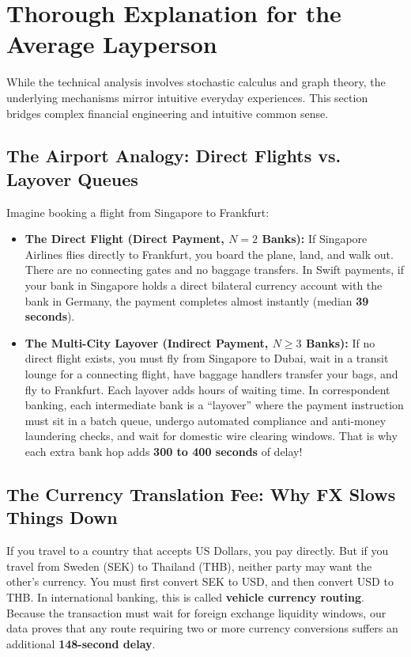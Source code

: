 \documentclass[11pt,a4paper]{article}
\begin{document}
\section{Thorough Explanation for the Average Layperson}

While the technical analysis involves stochastic calculus and graph theory, the underlying mechanisms mirror intuitive everyday experiences. This section bridges complex financial engineering and intuitive common sense.

\subsection{The Airport Analogy: Direct Flights vs. Layover Queues}
Imagine booking a flight from Singapore to Frankfurt:
\begin{itemize}
    \item \textbf{The Direct Flight (Direct Payment, $N=2$ Banks):} If Singapore Airlines flies directly to Frankfurt, you board the plane, land, and walk out. There are no connecting gates and no baggage transfers. In Swift payments, if your bank in Singapore holds a direct bilateral currency account with the bank in Germany, the payment completes almost instantly (median \textbf{39 seconds}).
    \item \textbf{The Multi-City Layover (Indirect Payment, $N \ge 3$ Banks):} If no direct flight exists, you must fly from Singapore to Dubai, wait in a transit lounge for a connecting flight, have baggage handlers transfer your bags, and fly to Frankfurt. Each layover adds hours of waiting time. In correspondent banking, each intermediate bank is a ``layover'' where the payment instruction must sit in a batch queue, undergo automated compliance and anti-money laundering checks, and wait for domestic wire clearing windows. That is why each extra bank hop adds \textbf{300 to 400 seconds} of delay!
\end{itemize}

\subsection{The Currency Translation Fee: Why FX Slows Things Down}
If you travel to a country that accepts US Dollars, you pay directly. But if you travel from Sweden (SEK) to Thailand (THB), neither party may want the other's currency. You must first convert SEK to USD, and then convert USD to THB. In international banking, this is called \textbf{vehicle currency routing}. Because the transaction must wait for foreign exchange liquidity windows, our data proves that any route requiring two or more currency conversions suffers an additional \textbf{148-second delay}.
\end{document}
